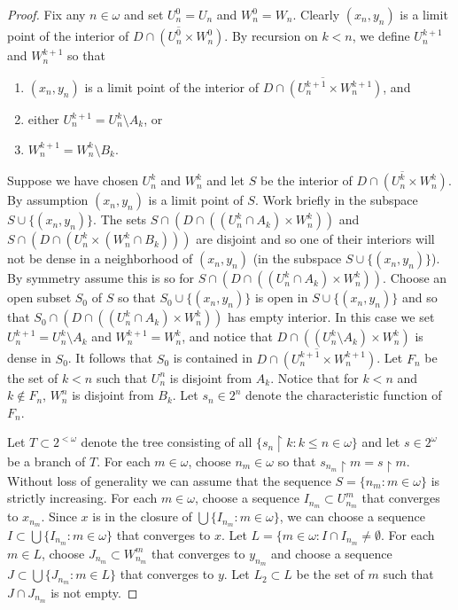 \documentclass{amsart}
\theoremstyle{definition}
\theoremstyle{remark}
\begin{document}
\begin{proof}
Fix any $n\in\omega$ and set $U_n^0=U_n$ and $W_n^0= W_n$. 
Clearly $(x_n,y_n)$ is a limit point of the interior
of $\overline{D\cap (U^0_n\times W^0_n)}$.
By recursion on 
 $k < n$, we define $U_n^{k{+}1}$ and $W_n^{k{+}1}$
 so that  
 \begin{enumerate}
\item $(x_n,y_n)$ is a limit point of the interior of
    $\overline{D\cap (U^{k{+}1}_n\times W^{k{+}1}_n)}$, and
    \item either $U^{k{+}1}_n =U^k_n\setminus A_k$, or
    \item $W^{k{+}1}_n = W^k_n\setminus B_k$.
 \end{enumerate}
Suppose we have chosen $U^k_n$ and $W^k_n$ and let
$S$ be the interior of $\overline{D\cap (U^k_n\times W^k_n)}$. 
By assumption $(x_n,y_n)$ is a limit point of $S$.
Work briefly in the subspace $S\cup \{(x_n,y_n)\}$.  The sets
$S\cap (D\cap ((U^k_n\cap A_k)\times W^k_n))$ and $S\cap (D\cap (U^k_n\times (W^k_n\cap  B_k)))$
are disjoint and so one of their interiors 
will not be dense in a neighborhood of $(x_n,y_n)$
 (in the subspace $S\cup \{ (x_n,y_n)\}$). 
 By
 symmetry assume this is so for $S\cap (D\cap ((U^k_n\cap A_k)\times W^k_n))$.
 Choose an open subset $S_0$ of $S$ so that $S_0\cup \{(x_n,y_n)\}$
 is open in $S\cup \{ (x_n,y_n)\}$ 
 and so that $S_0\cap (D\cap ((U^k_n\cap A_k)\times W^k_n))$ has empty interior.
 In this case we set $U^{k{+}1}_n = U^k_n\setminus A_k$
 and $W^{k{+}1}_n = W^k_n$, and notice that 
  $D\cap ((U^k_n\setminus A_k) \times W^k_n)$ is dense
  in $S_0$. 
 It follows that
  $S_0$ is contained in $\overline{D\cap (U^{k{+}1}_n\times W^{k{+}1}_n)}$. 
  Let $F_n $  be the set of $k< n$
  such that  $U^{n}_n$ is disjoint from $A_k$. Notice
  that  for $ k< n$ and $k\notin F_n$,
    $W^{n}_n$ is disjoint from $B_k$. 
     Let $s_n\in 2^n$ denote the characteristic function of $F_n$.

     Let $T\subset 2^{<\omega}$ denote the tree consisting
     of all $\{ s_n\restriction k : k \leq n \in \omega\}$
     and let $s\in 2^\omega$ be a branch of $T$. 
     For each $m\in \omega$, choose $n_m\in \omega$ so that
      $s_{n_m}\restriction m = s\restriction m$. Without loss
      of generality we can assume that the sequence
       $S= \{ n_m : m\in\omega\}$ is strictly increasing.
       For each $m\in\omega$, choose a sequence $I_{n_m}\subset 
        U^m_{n_m}$ that converges to $x_{n_m}$. 
        Since $x$ is in the closure of $\bigcup\{ I_{n_m} : m\in\omega\}$,
         we can choose a sequence $I\subset 
         \bigcup\{ I_{n_m} : m\in\omega\}$ that converges to $x$.
         Let $L = \{ m\in \omega : I\cap I_{n_m}\neq\emptyset$. 
         For each $m\in L$, choose $J_{n_m}\subset W^m_{n_m}$ that
         converges to $y_{n_m}$ and choose a sequence $J\subset
          \bigcup\{ J_{n_m}  : m\in L\}$ that converges to $y$.
          Let $L_2\subset L$ be the set of $m$ such
          that $J\cap J_{n_m}$ is not empty.


\end{proof}
\end{document}
